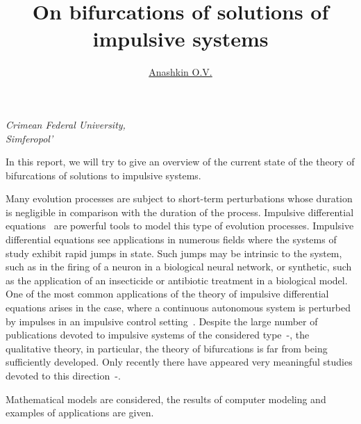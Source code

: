 \documentclass[12pt]{article}
\begin{document}
	
	
	\title{\bf\Large On bifurcations of solutions of impulsive systems}
	\author{\underline{Anashkin O.V.}}
	\date{}
	
	
\begin{center}
	\maketitle
	{\large\textit{Crimean Federal University,\\
			Simferopol'}}
\end{center}

In this report, we will try to give an overview of the current state of the theory of bifurcations of solutions to impulsive systems.

Many evolution processes are subject to short-term perturbations whose duration is negligible in
comparison with the duration of the process. Impulsive differential equations~\cite{samoilenko-perestyuk1987, samoilenko-perestyuk1995} are powerful tools to model this type of evolution processes. Impulsive differential equations see applications in numerous fields where the systems of study exhibit rapid jumps in state. Such jumps may be intrinsic to the system,
such as in the firing of a neuron in a biological neural network, or synthetic, such as the application of
an insecticide or antibiotic treatment in a biological model. One of the most common applications of
the theory of impulsive differential equations arises in the case, where a continuous autonomous
system is perturbed by impulses in an impulsive control setting~\cite{Lakmeche_Arino2001, Xie2017}. Despite the large number of publications devoted to impulsive systems of the considered type~\cite{Hristova}-\cite{Anashkin2021}, the qualitative theory, in particular, the theory of bifurcations  is far from being sufficiently developed. Only recently there have appeared very meaningful studies devoted to this direction~\cite{Church_Liu2017}-\cite{Akhmet_Kashkynbayev2017}.

Mathematical models are considered, the results of computer modeling and examples of applications are given.
\end{document}
